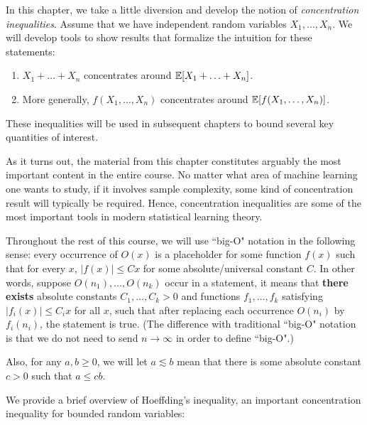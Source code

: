 \setcounter{section}{0}


In this chapter, we take a little diversion and develop the notion of \emph{concentration inequalities}. Assume that we have independent random variables $X_1, \ldots, X_n$. We will develop tools to show results that formalize the intuition for these statements:
\begin{enumerate}
    \item $X_1 + \ldots + X_n$ concentrates around $\operatorname*{\mathbb{E}}[X_1 + \ldots + X_n]$.
    \item More generally, $f(X_1, \ldots, X_n)$ concentrates around $\operatorname*{\mathbb{E}}[f(X_1, \ldots, X_n)]$.
\end{enumerate}

These inequalities will be used in subsequent chapters to bound several key quantities of interest.

As it turns out, the material from this chapter constitutes arguably the most important content in the entire course. No matter what area of machine learning one wants to study, if it involves sample complexity, some kind of concentration result will typically be required. Hence, concentration inequalities are some of the most important tools in modern statistical learning theory.


Throughout the rest of this course, we will use ``big-O" notation in the following sense: every occurrence of $O(x)$ is a placeholder for some function $f(x)$ such that for every $x$, $|f(x)| \leq Cx$ for some absolute/universal constant $C$. In other words, suppose $O(n_1),\dots, O(n_k)$ occur in a statement, it means that \textbf{there exists} absolute constants $C_1,\dots, C_k > 0$ and functions $f_1,\dots, f_k$ satisfying $|f_i(x)|\le C_ix$ for all $x$, such that after replacing each occurrence $O(n_i)$ by $f_i(n_i)$,  the statement is true.  (The difference with traditional ``big-O" notation is that we do not need to send $n \to \infty$ in order to define ``big-O".)

Also, for any $a, b \geq 0$, we will let $a \lesssim b$ mean that there is some absolute constant $c > 0$ such that $a \leq cb$.


\label{lec2:subsec:hoeffding}

We provide a brief overview of Hoeffding's inequality, an important concentration inequality for bounded random variables:

